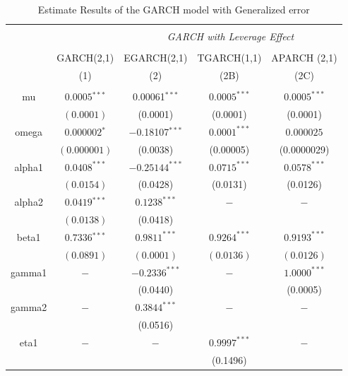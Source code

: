 \documentclass[a4paper]{article}
\begin{document}
\begin{table}[H] \centering 
  \caption{Estimate Results of the GARCH model with Generalized error} 
  \label{tab:garch} 
\begin{tabular}{@{\extracolsep{5pt}} ccccc} 

\\[-1.8ex]\hline 
\hline \\[-1.8ex] 

& & \multicolumn{3}{c}{\textit{GARCH with Leverage Effect}} \\ 
\cline{3-5} 
\\[-1.8ex] & GARCH(2,1) & EGARCH(2,1) & TGARCH(1,1) & APARCH (2,1) 
\\ 
 & (1) & (2) & (2B) & (2C) \\ %
\hline \\[-1.8ex] 
mu & $0.0005$$^{***}$ &  0.00061$^{***}$ & $0.0005^{***}$ & $0.0005^{***}$ \\
   &$(0.0001)$ & (0.0001) & (0.0001)& (0.0001)\\[1.8ex]

omega & $0.000002$$^{*}$ & $-$0.18107$^{***}$ & $0.0001^{***}$ & $0.000025$  \\ 
&$(0.000001)$& (0.0038)& (0.00005) & (0.0000029)\\[1.8ex]

alpha1 & $0.0408^{***}$ & $-0.25144^{***}$ & $0.0715^{***}$ & $0.0578^{***}$  \\ 
&$(0.0154)$& (0.0428)& (0.0131) & (0.0126)\\[1.8ex]

alpha2 & $0.0419$$^{***}$ & $0.1238^{***}$ & $-$ & $-$ \\
&$(0.0138)$& (0.0418)& & \\[1.8ex]

beta1 & $0.7336$$^{***}$ & $0.9811^{***}$ & $0.9264^{***}$ & $0.9193^{***}$  \\ 
& $(0.0891)$ & $(0.0001)$ & $(0.0136)$ & $(0.0126)$ \\[1.8ex] 

gamma1 & $-$ & $-0.2336^{***}$ & $-$ & $1.0000^{***}$  \\ 
& & (0.0440)& &(0.0005)\\[1.8ex]

gamma2 & $-$ & $0.3844^{***}$ & $-$ & $-$  \\ 
& & (0.0516)& & \\[1.8ex]

eta1 & $-$ & $-$ & $0.9997^{***}$ & $-$  \\ 
& & & (0.1496) & \\[1.8ex]


\end{tabular}
\end{table}
\end{document}
